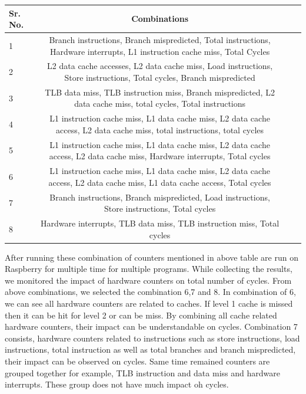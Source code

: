 \begin{tabular}{|l|c|r|p{1.7cm}|}
  \hline
  \textbf{Sr. No.} & \textbf{Combinations}\\
  \hline
  1 & Branch instructions, Branch mispredicted, Total instructions, Hardware interrupts, L1 instruction cache miss, Total Cycles\\
  \hline
  2 & L2 data cache accesses, L2 data cache miss, Load instructions, Store instructions, Total cycles, Branch mispredicted\\
  \hline
  3 & TLB data miss, TLB instruction miss,  Branch mispredicted, L2 data cache miss, total cycles, Total instructions \\
  \hline
  4 & L1 instruction cache miss, L1 data cache miss, L2 data cache access, L2 data cache miss, total instructions, total cycles\\
  \hline
 5 & L1 instruction cache miss, L1 data cache miss, L2 data cache access, L2 data cache miss, Hardware interrupts, Total cycles\\
  \hline
  6 & L1 instruction cache miss, L1 data cache miss, L2 data cache access, L2 data cache miss, L1 data cache access, Total cycles \\
  \hline
  7 & Branch instructions, Branch mispredicted, Load instructions, Store instructions, Total cycles\\
  \hline
  8 & Hardware interrupts, TLB data miss, TLB instruction miss, Total cycles \\
  \hline
\end{tabular}


\par After running these combination of counters mentioned in above table are run on Raspberry for multiple time for multiple programs. While collecting the results, we monitored the impact of hardware counters on total number of cycles. From above combinations, we selected the combination 6,7 and 8. In combination of 6, we can see all hardware counters are related to caches. If level 1 cache is missed then it can be hit for level 2 or can be miss. By combining all cache related hardware counters, their impact can be understandable on cycles. Combination 7 consists, hardware counters related to instructions such as store instructions, load instructions, total instruction as well as total branches and branch mispredicted, their impact can be observed on cycles. Same time remained counters are grouped together for example, TLB instruction and data miss and hardware interrupts. These group does not have much impact oh cycles. 

